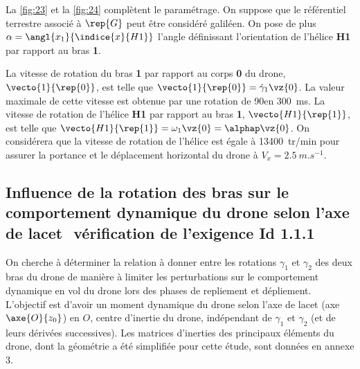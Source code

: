 La \autoref{fig:23} et la \autoref{fig:24} complètent le paramétrage. 
On suppose que le référentiel terrestre
associé à $\rep{G}$ peut être considéré galiléen. On pose de plus $\alpha = \angl{x_1}{\indice{x}{H1}}$ l’angle définissant
l’orientation de l’hélice \textbf{H1} par rapport au bras \textbf{1}.

La vitesse de rotation du bras \textbf{1} par rapport au corps \textbf{0} du drone, $\vecto{1}{\rep{0}}$, est telle que $\vecto{1}{\rep{0}} = \dot{\gamma}_1\vz{0}$. La valeur maximale de cette vitesse est obtenue par une rotation de 90\degres en \SI{300}{ms}.
La vitesse de rotation de l’hélice \textbf{H1} par rapport au bras \textbf{1}, $\vecto{H1}{\rep{1}}$, est telle que 
$\vecto{H1}{\rep{1}} = \omega_1\vz{0} = \alphap \vz{0}$. 
On considérera que la vitesse de rotation de l’hélice est égale à
\SI{13 400}{tr/min} pour assurer la portance et le déplacement horizontal du drone à $V_x = \SI{2,5}{m.s^{-1}}$.

\ifprof
\begin{corrige}
\end{corrige}
\else
\fi

\ifprof
\begin{corrige}
\end{corrige}
\else
\fi

\subsection{Influence de la rotation des bras sur le comportement dynamique du drone selon
l’axe de lacet ­ vérification de l’exigence Id 1.1.1}

On cherche à déterminer la relation à donner entre les rotations $\gamma_1$ et $\gamma_2$ des deux bras du
drone de manière à limiter les perturbations sur le comportement dynamique en vol du drone
lors des phases de repliement et dépliement. L’objectif est d’avoir un moment dynamique du
drone selon l’axe de lacet (axe $\axe{O}{z_0}$) en $O$, centre d’inertie du drone, indépendant de $\gamma_1$
et $\gamma_2$ (et de leurs dérivées successives). Les matrices d’inerties des principaux éléments du
drone, dont la géométrie a été simplifiée pour cette étude, sont données en annexe 3.

